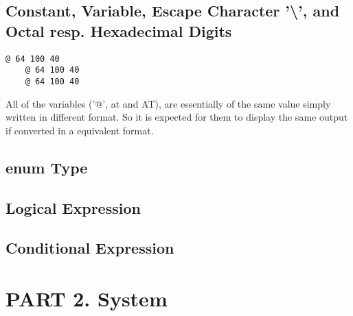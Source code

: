 \documentclass[12pt,letterpaper]{article}
\begin{document}
    \subsection{Constant, Variable, Escape Character '\textbackslash', and Octal resp. Hexadecimal Digits}
    \begin{lstlisting}[style=output]
    @ 64 100 40
    @ 64 100 40
    @ 64 100 40
    \end{lstlisting}
    All of the variables ('@', at and AT), are essentially of the same value simply written in different format. So it is expected for them to display the same output if converted in a equivalent format.
    
    \subsection{enum Type}
    \subsection{Logical Expression}
    \subsection{Conditional Expression}

\section*{PART 2. System}
\end{document}
